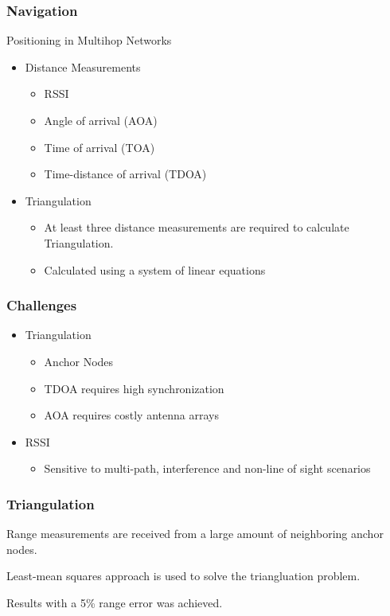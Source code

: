 \begin{frame}[t]
  \frametitle{Navigation}
  
  Positioning in Multihop Networks
  \begin{itemize}
  \item Distance Measurements
    \begin{itemize}
    \item RSSI
    \item Angle of arrival (AOA)
    \item Time of arrival (TOA)
    \item Time-distance of arrival (TDOA)
    \end{itemize}
  \item Triangulation
    \begin{itemize}
      \item At least three distance measurements are required to calculate
        Triangulation.
      \item Calculated using a system of linear equations
    \end{itemize}
  \end{itemize}

  \vfill

\end{frame}

\begin{frame}[t]
  \frametitle{Challenges}

  \begin{itemize}
  \item Triangulation
    \begin{itemize}
    \item Anchor Nodes
    \item TDOA requires high synchronization
    \item AOA requires costly antenna arrays
    \end{itemize}
  \item RSSI
    \begin{itemize}
      \item Sensitive to multi-path, interference and non-line of sight
        scenarios
    \end{itemize}
  \end{itemize}

  \vfill

\end{frame}

\begin{frame}[t]
  \frametitle{Triangulation}

  Range measurements are received from a large amount of neighboring anchor
  nodes.

  Least-mean squares approach is used to solve the triangluation problem.

  Results with a 5\% range error was achieved.

  \vfill

\end{frame}

